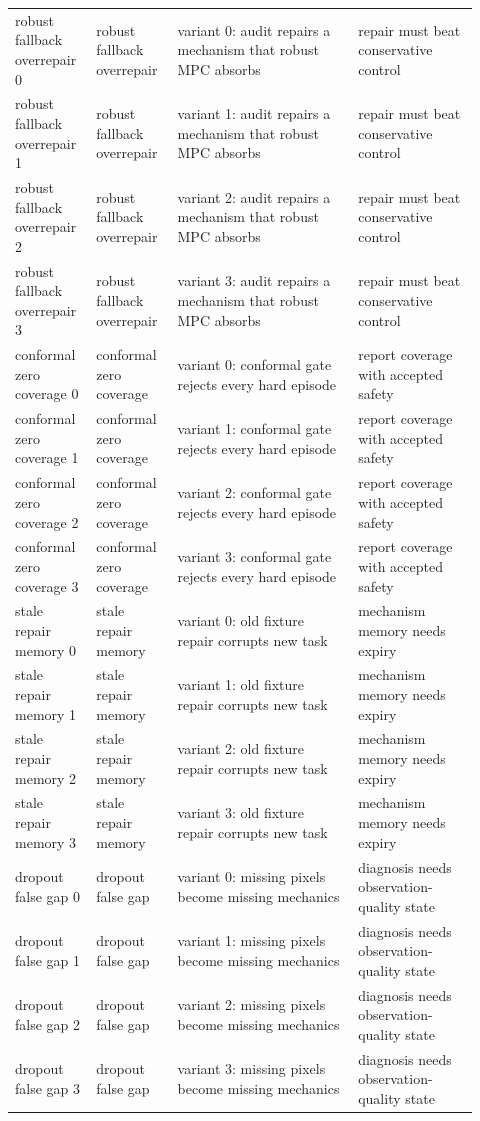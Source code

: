 \documentclass{article}
\begin{document}
\begin{center}
\begin{longtable}{@{}p{0.16\linewidth}p{0.16\linewidth}p{0.36\linewidth}p{0.24\linewidth}@{}}
robust fallback overrepair 0 & robust fallback overrepair & variant 0: audit repairs a mechanism that robust MPC absorbs & repair must beat conservative control\\
robust fallback overrepair 1 & robust fallback overrepair & variant 1: audit repairs a mechanism that robust MPC absorbs & repair must beat conservative control\\
robust fallback overrepair 2 & robust fallback overrepair & variant 2: audit repairs a mechanism that robust MPC absorbs & repair must beat conservative control\\
robust fallback overrepair 3 & robust fallback overrepair & variant 3: audit repairs a mechanism that robust MPC absorbs & repair must beat conservative control\\
conformal zero coverage 0 & conformal zero coverage & variant 0: conformal gate rejects every hard episode & report coverage with accepted safety\\
conformal zero coverage 1 & conformal zero coverage & variant 1: conformal gate rejects every hard episode & report coverage with accepted safety\\
conformal zero coverage 2 & conformal zero coverage & variant 2: conformal gate rejects every hard episode & report coverage with accepted safety\\
conformal zero coverage 3 & conformal zero coverage & variant 3: conformal gate rejects every hard episode & report coverage with accepted safety\\
stale repair memory 0 & stale repair memory & variant 0: old fixture repair corrupts new task & mechanism memory needs expiry\\
stale repair memory 1 & stale repair memory & variant 1: old fixture repair corrupts new task & mechanism memory needs expiry\\
stale repair memory 2 & stale repair memory & variant 2: old fixture repair corrupts new task & mechanism memory needs expiry\\
stale repair memory 3 & stale repair memory & variant 3: old fixture repair corrupts new task & mechanism memory needs expiry\\
dropout false gap 0 & dropout false gap & variant 0: missing pixels become missing mechanics & diagnosis needs observation-quality state\\
dropout false gap 1 & dropout false gap & variant 1: missing pixels become missing mechanics & diagnosis needs observation-quality state\\
dropout false gap 2 & dropout false gap & variant 2: missing pixels become missing mechanics & diagnosis needs observation-quality state\\
dropout false gap 3 & dropout false gap & variant 3: missing pixels become missing mechanics & diagnosis needs observation-quality state\\
\bottomrule
\end{longtable}
\normalsize
\end{center}
\end{document}

